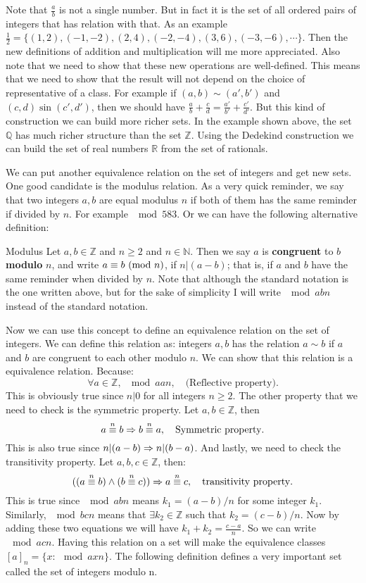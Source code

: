 Note that $\frac{a}{b}$ is not a single number. But in fact it is the set of all ordered pairs of integers that has relation with that. As an example $\frac{1}{2} = \{ (1,2), (-1,-2), (2,4), (-2,-4), (3,6), (-3,-6), \cdots \}$. Then the new definitions of addition and multiplication will me more appreciated. Also note that we need to show that these new operations are well-defined. This means that we need to show that the result will not depend on the choice of representative of a class. For example if $(a,b) \sim (a',b')$ and $(c,d) \sin (c',d')$, then we should have $\frac{a}{b} + \frac{c}{d} = \frac{a'}{b'} + \frac{c'}{d'}. $ But this kind of construction we can build more richer sets. In the example shown above, the set $\mathbb{Q}$ has much richer structure than the set $\mathbb{Z}$. Using the Dedekind construction we can build the set of real numbers $\mathbb{R}$ from the set of rationals. 

We can put another equivalence relation on the set of integers and get new sets. One good candidate is the modulus relation. As a very quick reminder, we say that two integers $a,b$ are equal modulus $n$ if both of them has the same reminder if divided by $n$. For example $\mod{5}{8}{3}$. Or we can have the following alternative definition:

\begin{defbox}{Modulus}
	Let $a,b \in \mathbb{Z}$ and $n \geq 2$ and $n \in \mathbb{N}$. Then we say $a$ is \textbf{congruent} to $b$ \textbf{modulo} $n$, and write $\modd{a}{b}{n}$, if $n|(a-b)$; that is, if $a$ and $b$ have the same reminder when divided by $n$. Note that although the standard notation is the one written above, but for the sake of simplicity I will write $\mod{a}{b}{n}$ instead of the standard notation.
\end{defbox}


Now we can use this concept to define an equivalence relation on the set of integers. We can define this relation as: integers $a,b$ has the relation $a \sim b$ if $a$ and $b$ are congruent to each other modulo $n.$ We can show that this relation is a equivalence relation. Because:
\[ \forall a \in \mathbb{Z},\ \mod{a}{a}{n}, \quad \text{(Reflective property).} \]
This is obviously true since $n | 0$ for all integers $n \geq 2$. The other property that we need to check is the symmetric property. Let $a,b \in \mathbb{Z}$, then
\[ \mod{a}{b}{n} \imply \mod{b}{a}{n}, \quad \text{Symmetric property}. \]
This is also true since $n|(a-b)  \imply n|(b-a)$. And lastly, we need to check the transitivity property. Let $a,b,c \in \mathbb{Z}$, then:
\[ ((\mod{a}{b}{n}) \wedge (\mod{b}{c}{n})) \imply \mod{a}{c}{n}, \quad \text{transitivity property}. \]
This is true since $\mod{a}{b}{n}$ means $k_1 = (a-b)/n$ for some integer $k_1$. Similarly, $\mod{b}{c}{n}$ means that $\exists k_2 \in \mathbb{Z}$ such that $k_2 = (c-b)/n$. Now by adding these two equations we will have $k_1 + k_2 = \frac{c-a}{n}$. So we can write $\mod{a}{c}{n}$.
Having this relation on a set will make the equivalence classes $[a]_{n} = \{ x: \mod{a}{x}{n} \}$. The following definition defines a very important set called the set of integers modulo n.

